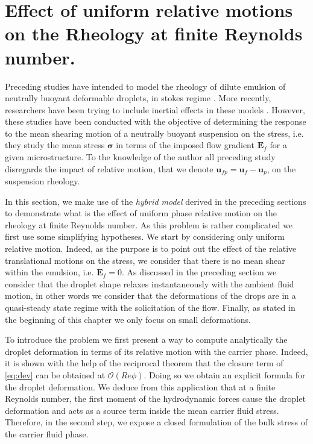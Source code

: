 \section{
    Effect of uniform relative motions on the Rheology at finite Reynolds number. 
    }
\label{sec:particle_def}


Preceding studies have intended to model the rheology of dilute emulsion of neutrally buoyant deformable droplets, in stokes regime 
\citep{rallison1984deformation,lhuillier1987phenomenology}.
More recently, researchers have been trying to include inertial effects in these models \citep{raja2010inertial,mwasame2018macroscopic}. 
However, these studies have been conducted with the objective of determining the response to the mean shearing motion of a neutrally buoyant suspension on the stress, i.e. they study the mean stress $\bm{\sigma}$ in terms of the imposed flow gradient $\textbf{E}_f$ for a given microstructure. 
To the knowledge of the author all preceding study disregards the impact of relative motion, that we denote $\textbf{u}_{fp} = \textbf{u}_f - \textbf{u}_p$, on the suspension rheology.


In this section, we make use of the \textit{hybrid model} derived in the preceding sections to demonstrate what is the effect of uniform phase relative motion on the rheology at finite Reynolds number. 
As this problem is rather complicated we first use some simplifying hypotheses. 
We start by considering only uniform relative motion. 
Indeed, as the purpose is to point out the effect of the relative translational motions on the stress, we consider that there is no mean shear within the emulsion, i.e. $\textbf{E}_f = 0$. 
As discussed in the preceding section we consider that the droplet shape relaxes instantaneously with the ambient fluid motion, in other words we consider that the deformations of the drops are in a quasi-steady state regime with the solicitation of the flow. 
Finally, as stated in the beginning of this chapter we only focus on small deformations.  



To introduce the problem we first present a way to compute analytically the droplet deformation in terms of its relative motion with the carrier phase. 
Indeed, it is shown with the help of the reciprocal theorem that the closure term of \ref{eq:dev} can be obtained at $\mathcal{O}(Re \phi)$.
Doing so we obtain an explicit formula for the droplet deformation. 
We deduce from this application that at a finite Reynolds number, the first moment of the hydrodynamic forces cause the droplet deformation and acts as a source term inside the mean carrier fluid stress. 
Therefore, in the second step, we expose a closed formulation of the bulk stress of the carrier fluid phase. 



